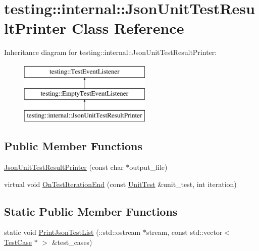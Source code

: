 \hypertarget{classtesting_1_1internal_1_1JsonUnitTestResultPrinter}{}\section{testing\+::internal\+::Json\+Unit\+Test\+Result\+Printer Class Reference}
\label{classtesting_1_1internal_1_1JsonUnitTestResultPrinter}
Inheritance diagram for testing\+::internal\+::Json\+Unit\+Test\+Result\+Printer\+:\begin{figure}[H]
\begin{center}
\leavevmode
\includegraphics[height=3.000000cm]{classtesting_1_1internal_1_1JsonUnitTestResultPrinter}
\end{center}
\end{figure}
\subsection*{Public Member Functions}
\begin{DoxyCompactItemize}
\item 
\mbox{\hyperlink{classtesting_1_1internal_1_1JsonUnitTestResultPrinter_a273623decde1be18db45e95594f9d501}{Json\+Unit\+Test\+Result\+Printer}} (const char $\ast$output\+\_\+file)
\item 
virtual void \mbox{\hyperlink{classtesting_1_1internal_1_1JsonUnitTestResultPrinter_a44edb54cf1ab8cdcd56bda5058b8f1d6}{On\+Test\+Iteration\+End}} (const \mbox{\hyperlink{classtesting_1_1UnitTest}{Unit\+Test}} \&unit\+\_\+test, int iteration)
\end{DoxyCompactItemize}
\subsection*{Static Public Member Functions}
\begin{DoxyCompactItemize}
\item 
static void \mbox{\hyperlink{classtesting_1_1internal_1_1JsonUnitTestResultPrinter_ab9826c030ba8c68c3e58b3ae69db85ea}{Print\+Json\+Test\+List}} (\+::std\+::ostream $\ast$stream, const std\+::vector$<$ \mbox{\hyperlink{classtesting_1_1TestCase}{Test\+Case}} $\ast$ $>$ \&test\+\_\+cases)
\end{DoxyCompactItemize}


